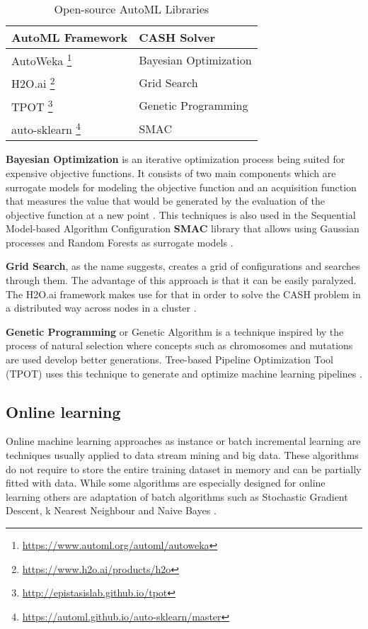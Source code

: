\documentclass{sig-alternate-br}
\begin{document}
\begin{savenotes}
\begin{table}[h]
\renewcommand{\arraystretch}{1.25}
\label{table:libraries}
\centering
\begin{tabular}{|l|l|}
\hline
\textbf{AutoML Framework} & \textbf{CASH Solver} \\ \hline
AutoWeka \footnote{\url{https://www.automl.org/automl/autoweka}} & Bayesian Optimization \\ \hline
H2O.ai \footnote{\url{https://www.h2o.ai/products/h2o}} & Grid Search \\ \hline
TPOT \footnote{\url{http://epistasislab.github.io/tpot}} & Genetic Programming \\ \hline
auto-sklearn \footnote{\url{https://automl.github.io/auto-sklearn/master}} &  SMAC \\ \hline
\end{tabular}
\caption{Open-source AutoML Libraries}
\end{table}
\end{savenotes}

\textbf{Bayesian Optimization} is an iterative optimization process being suited for expensive objective functions. It consists of two main components which are surrogate models for modeling the objective function and an acquisition function that measures the value that would be generated by the evaluation of the objective function at a new point \cite{zoller2019survey}. This techniques is also used in the Sequential Model-based Algorithm Configuration \textbf{SMAC} library that allows using Gaussian processes and Random Forests as surrogate models \cite{feurer2015autosklearn}.

\textbf{Grid Search}, as the name suggests, creates a grid of configurations and searches through them. The advantage of this approach is that it can be easily paralyzed. The H2O.ai framework makes use for that in order to solve the CASH problem in a distributed way across nodes in a cluster \cite{h2o}. 

\textbf{Genetic Programming} or Genetic Algorithm is a technique inspired by the process of natural selection where concepts such as chromosomes and mutations are used develop better generations. Tree-based Pipeline Optimization Tool (TPOT) uses this technique to generate and optimize machine learning pipelines \cite{tpot}.

\subsection{Online learning}
Online machine learning approaches as instance or batch incremental learning are techniques usually applied to data stream mining and big data. These algorithms do not require to store the entire training dataset in memory and can be partially fitted with data. While some algorithms are especially designed for online learning \cite{bifet2012ensembles} others are adaptation of batch algorithms such as Stochastic Gradient Descent, k Nearest Neighbour and Naive Bayes \cite{van2014algorithm}. 
\end{document}
